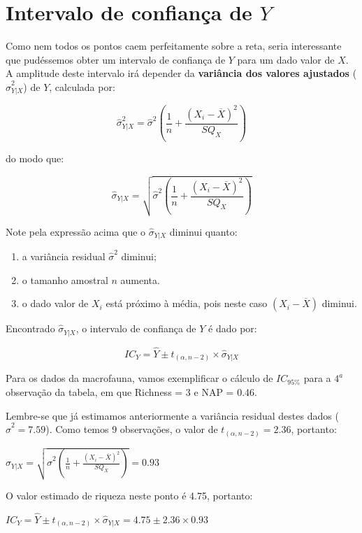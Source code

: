 \documentclass[
]{book}
\providecommand{\tightlist}{%
  \setlength{\itemsep}{0pt}\setlength{\parskip}{0pt}}
\begin{document}
\hypertarget{intervalo-de-confianuxe7a-de-y}{%
\section{\texorpdfstring{Intervalo de confiança de \(Y\)}{Intervalo de confiança de Y}}\label{intervalo-de-confianuxe7a-de-y}}

Como nem todos os pontos caem perfeitamente sobre a reta, seria interessante que pudéssemos obter um intervalo de confiança de \(Y\) para um dado valor de \(X\). A amplitude deste intervalo irá depender da \textbf{variância dos valores ajustados} (\(\hat{\sigma}^2_{Y|X}\)) de \(Y\), calculada por:

\[\hat{\sigma}^2_{Y|X} = \hat{\sigma}^2(\frac{1}{n} + \frac{(X_i-\overline{X})^2}{SQ_X})\]

do modo que:

\[\hat{\sigma}_{Y|X} = \sqrt{\hat{\sigma}^2(\frac{1}{n} + \frac{(X_i-\overline{X})^2}{SQ_X})}\]

Note pela expressão acima que o \(\hat{\sigma}_{Y|X}\) diminui quanto:

\begin{enumerate}
\def\labelenumi{\arabic{enumi}.}
\tightlist
\item
  a variância residual \(\hat{\sigma}^2\) diminui;
\item
  o tamanho amostral \(n\) aumenta.
\item
  o dado valor de \(X_i\) está próximo à média, pois neste caso \((X_i-\overline{X})\) diminui.
\end{enumerate}

Encontrado \(\hat{\sigma}_{Y|X}\), o intervalo de confiança de \(Y\) é dado por:

\[IC_{Y} = \hat{Y}\pm t_{(\alpha, n-2)} \times \hat{\sigma}_{Y|X}\]

Para os dados da macrofauna, vamos exemplificar o cálculo de \(IC_{95\%}\) para a \(4^a\) observação da tabela, em que Richness = 3 e NAP = 0.46.

Lembre-se que já estimamos anteriormente a variância residual destes dados (\(\hat{\sigma}^2 = 7.59\)). Como temos 9 observações, o valor de \(t_{(\alpha, n-2)} = 2.36\), portanto:

\(\hat{\sigma}_{Y|X} = \sqrt{\hat{\sigma}^2(\frac{1}{n} + \frac{(X_i-\overline{X})^2}{SQ_X})} = 0.93\)

O valor estimado de riqueza neste ponto é 4.75, portanto:

\(IC_{Y} = \hat{Y} \pm t_{(\alpha, n-2)} \times \hat{\sigma}_{Y|X} = 4.75 \pm 2.36 \times 0.93\)
\end{document}
